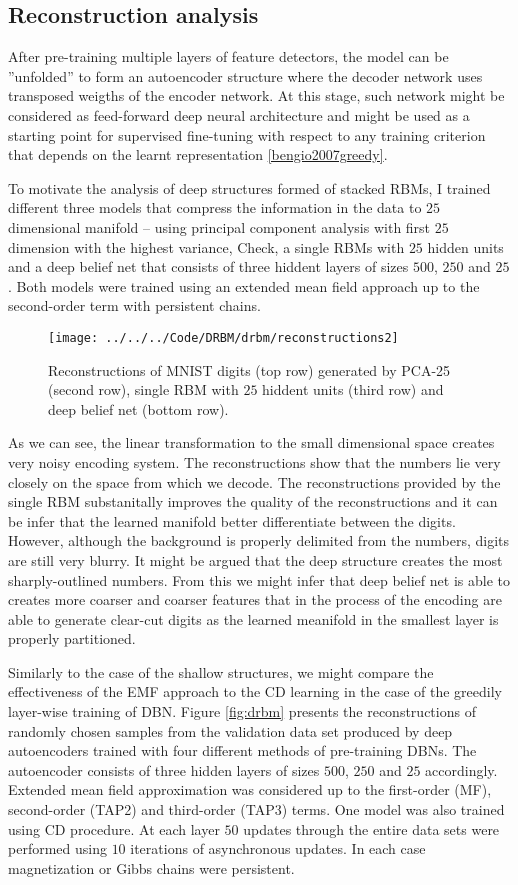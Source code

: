 \subsection{Reconstruction analysis}
After pre-training multiple layers of feature detectors, the model can be ''unfolded'' to form an autoencoder structure where the decoder network uses transposed weigths of the encoder network. At this stage, such network might be considered as feed-forward deep neural architecture and might be used as a starting point for supervised fine-tuning with respect to any training criterion that depends on the learnt representation \ref{bengio2007greedy}.

To motivate the analysis of deep structures formed of stacked RBMs, I trained different three models that compress the information in the data to $25$ dimensional manifold -- using principal component analysis with first $25$ dimension with the highest variance, Check, a single RBMs with $25$ hidden units and a deep belief net that consists of three hiddent layers of sizes $500$, $250$ and $25$. Both models were trained using an extended mean field approach up to the second-order term with persistent chains.

\begin{figure}[!htb]
\texttt{[image: ../../../Code/DRBM/drbm/reconstructions2]}
  \caption[Reconstruction of digits with basic models]{Reconstructions of MNIST digits (top row) generated by PCA-25 (second row),  single RBM with $25$ hiddent units (third row) and deep belief net (bottom row).}
  \label{fig:pca}
\end{figure}
As we can see, the linear transformation to the small dimensional space creates very noisy encoding system. The reconstructions show that the numbers lie very closely on the space from which we decode. The reconstructions provided by the single RBM substanitally improves the quality of the reconstructions and it can be infer that the learned manifold better differentiate between the digits. However, although the background is properly delimited from the numbers, digits are still very blurry. It might be argued that the deep structure creates the most sharply-outlined numbers. From this we might infer that deep belief net is able to creates more coarser and coarser features that in the process of the encoding are able to generate clear-cut digits as the learned meanifold in the smallest layer is properly partitioned.

Similarly to the case of the shallow structures, we might compare the effectiveness of the EMF approach to the CD learning in the case of the greedily layer-wise training of DBN. Figure \ref{fig:drbm} presents the reconstructions of randomly chosen samples from the validation data set produced by deep autoencoders trained with four different methods of pre-training DBNs. The autoencoder consists of three hidden layers of sizes $500$, $250$ and $25$ accordingly. Extended mean field approximation was considered up to the first-order (MF), second-order (TAP2) and third-order (TAP3) terms. One model was also trained using CD procedure. At each layer $50$ updates through the entire data sets were performed using $10$ iterations of asynchronous updates. In each case magnetization or Gibbs chains were persistent.

